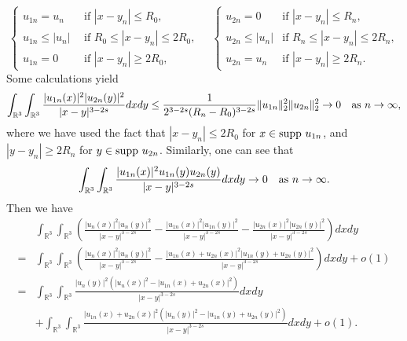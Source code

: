 \documentclass[reqno, 11pt]{amsart} %
\numberwithin{equation}{section}
\begin{document}
	\begin{equation*}
		\begin{cases}
			u_{1n}=u_{n}
			\quad &\text{if } |x-y_{n}|\leq R_{0},\\
			u_{1n}\leq|u_{n}|&\text{if } R_{0}\leq|x-y_{n}|\leq 2R_{0},\\
			u_{1n}=0&\text{if } |x-y_{n}|\geq 2R_{0},
		\end{cases}\quad 
		\begin{cases}
			u_{2n}=0
			\quad &\text{if } |x-y_{n}|\leq R_{n},\\
			u_{2n}\leq|u_{n}|&\text{if } R_{n}\leq|x-y_{n}|\leq 2R_{n},\\
			u_{2n}=u_{n}&\text{if } |x-y_{n}|\geq 2R_{n}.
		\end{cases}
	\end{equation*} 
	Some calculations yield
	\begin{equation*}
		\int_{\mathbb{R}^{3}}\int_{\mathbb{R}^{3}} \frac{|u_{1n}(x)|^{2}|u_{2n}(y)|^{2}}{|x-y|^{3-2s}}dxdy\leq\frac{1}{2^{3-2s}(R_{n}-R_{0})^{3-2s}}\| u_{1n}\|_{2}^{2}\| u_{2n}\|_{2}^{2}\rightarrow0\quad \hbox{as $n\rightarrow\infty$},
	\end{equation*}
	where we have used the fact that $|x-y_{n}|\leq2R_{0}$ for $x\in {\rm supp}~u_{1n}$, and $|y-y_{n}|\geq2R_{n}$ for $y\in {\rm supp}~u_{2n}$. Similarly, one can see that
	\begin{equation*}
		\int_{\mathbb{R}^{3}}\int_{\mathbb{R}^{3}} \frac{|u_{1n}(x)|^{2}u_{1n}(y)u_{2n}(y)}{|x-y|^{3-2s}}dxdy\rightarrow0\quad \hbox{as $n\rightarrow\infty$}.
	\end{equation*}
	Then we have
	\begin{equation*}
		\begin{split}
			&	\int_{\mathbb{R}^{3}}\int_{\mathbb{R}^{3}}\left( \frac{|u_{n}(x)|^{2}|u_{n}(y)|^{2}}{|x-y|^{3-2s}}-\frac{|u_{1n}(x)|^{2}|u_{1n}(y)|^{2}}{|x-y|^{3-2s}}-\frac{|u_{2n}(x)|^{2}|u_{2n}(y)|^{2}}{|x-y|^{3-2s}}\right) dxdy\\
			=&\int_{\mathbb{R}^{3}}\int_{\mathbb{R}^{3}}\left( \frac{|u_{n}(x)|^{2}|u_{n}(y)|^{2}}{|x-y|^{3-2s}}-\frac{|u_{1n}(x)+u_{2n}(x)|^{2}|u_{1n}(y)+u_{2n}(y)|^{2}}{|x-y|^{3-2s}}\right) dxdy+o(1)\\
			=&\int_{\mathbb{R}^{3}}\int_{\mathbb{R}^{3}} \frac{|u_{n}(y)|^{2}\left(|u_{n}(x)|^{2}-|u_{1n}(x)+u_{2n}(x)|^{2} \right) }{|x-y|^{3-2s}}dxdy\\
			&+\int_{\mathbb{R}^{3}}\int_{\mathbb{R}^{3}} \frac{|u_{1n}(x)+u_{2n}(x)|^{2}\left(|u_{n}(y)|^{2}-|u_{1n}(y)+u_{2n}(y)|^{2} \right) }{|x-y|^{3-2s}}dxdy+o(1).
		\end{split}
	\end{equation*}
\end{document}
